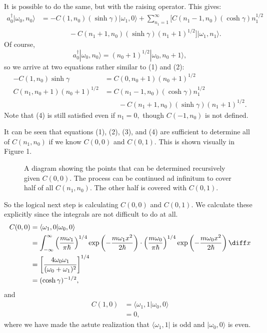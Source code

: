 \documentclass[12pt]{article}
\begin{document}
It is possible to do the same, but with the raising operator.  This gives:
\begin{align*}
	a_0^{\dagger}|\omega_0,n_0\rangle &= -C(1,n_0)(\sinh \gamma)|\omega_1,0\rangle  + \sum_{n_1=1}^{\infty} \Big[ C(n_1-1,n_0)(\cosh \gamma)n_1^{1/2} \\
					  & \qquad \qquad - C(n_1+1,n_0)(\sinh \gamma) (n_1+1)^{1/2}\Big] |\omega_1,n_1\rangle .
\end{align*}
Of course,
\[
	a_0^{\dagger}|\omega_0,n_0\rangle  = (n_0+1)^{1/2}|\omega_0,n_0+1\rangle ,
\] 
so we arrive at two equations rather similar to (1) and (2):
\begin{align}
	-C(1,n_0)\sinh \gamma &= C(0,n_0+1)(n_0+1)^{1/2} \\
	C(n_1,n_0+1)(n_0+1)^{1/2} &= C(n_1-1,n_0)(\cosh \gamma)n_1^{1/2} \nonumber \\
				  & \qquad - C(n_1+1,n_0)(\sinh \gamma) (n_1+1)^{1/2}.
\end{align}
Note that (4) is still satisfied even if $n_1=0,$ though $C(-1,n_0)$ is not defined.

It can be seen that equations (1), (2), (3), and (4) are sufficient to determine all of $C(n_1,n_0)$ if we know $C(0,0)$ and $C(0,1)$.  This is shown visually in Figure 1.  

\begin{figure}[ht]
	\centering
	\caption{A diagram showing the points that can be determined recursively given $C(0,0).$  The process can be continued ad infinitum to cover half of all $C(n_1,n_0)$.  The other half is covered with $C(0,1)$.}
\end{figure}

So the logical next step is calculating $C(0,0)$ and $C(0,1)$.  We calculate these explicitly since the integrals are not difficult to do at all.
\begin{align*}
	C(0,0) &= \langle \omega_1,0|\omega_0,0\rangle \\
	       &= \int_{-\infty}^{\infty} \left(\frac{m\omega_1}{\pi \hbar}\right)^{1/4}\exp\left(-\frac{m\omega_1 x^2}{2\hbar}\right)\cdot \left(\frac{m\omega_0}{\pi \hbar}\right)^{1/4}\exp\left(-\frac{m\omega_0 x^2}{2\hbar}\right)\diff x \\
	       &= \left[ \frac{4\omega_0\omega_1}{(\omega_0+\omega_1)^2}\right]^{1/4} \\
	       &= (\cosh \gamma)^{-1/2},
\end{align*}
and
\begin{align*}
	C(1,0) &= \langle \omega_1,1|\omega_0,0\rangle \\
	       &= 0,
\end{align*}
where we have made the astute realization that $\langle \omega_1,1|$ is odd and $|\omega_0,0\rangle $ is even.
\end{document}
